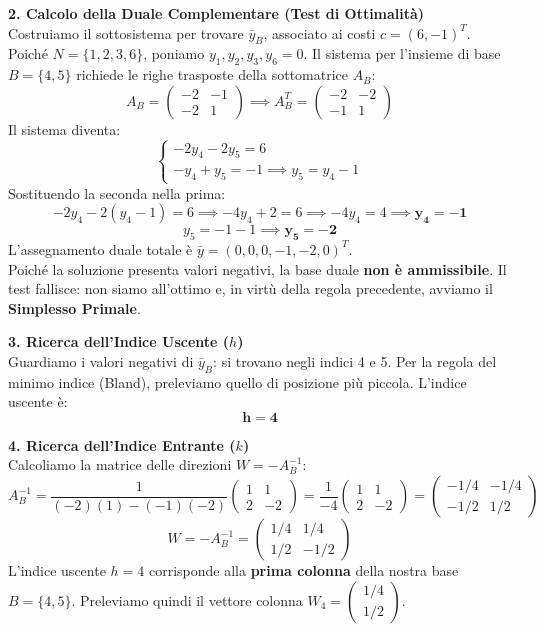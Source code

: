 \documentclass[12pt, a4paper]{article}
\begin{document}
	\vspace{0.4cm}
	\textbf{2. Calcolo della Duale Complementare (Test di Ottimalità)}\\
	Costruiamo il sottosistema per trovare $\bar{y}_B$, associato ai costi $c = (6, -1)^T$. Poiché $N = \{1, 2, 3, 6\}$, poniamo $y_1, y_2, y_3, y_6 = 0$. Il sistema per l'insieme di base $B=\{4,5\}$ richiede le righe trasposte della sottomatrice $A_B$:
	\[
	A_B = \begin{pmatrix} -2 & -1 \\ -2 & 1 \end{pmatrix} \implies A_B^T = \begin{pmatrix} -2 & -2 \\ -1 & 1 \end{pmatrix}
	\]
	Il sistema diventa:
	\[
	\begin{cases}
		-2y_4 - 2y_5 = 6 \\
		-y_4 + y_5 = -1 \implies y_5 = y_4 - 1
	\end{cases}
	\]
	Sostituendo la seconda nella prima:
	\[
	-2y_4 - 2(y_4 - 1) = 6 \implies -4y_4 + 2 = 6 \implies -4y_4 = 4 \implies \mathbf{y_4 = -1}
	\]
	\[
	y_5 = -1 - 1 \implies \mathbf{y_5 = -2}
	\]
	L'assegnamento duale totale è $\bar{y} = (0, 0, 0, -1, -2, 0)^T$. \\
	Poiché la soluzione presenta valori negativi, la base duale \textbf{non è ammissibile}. Il test fallisce: non siamo all'ottimo e, in virtù della regola precedente, avviamo il \textbf{Simplesso Primale}.
	
	\vspace{0.4cm}
	\textbf{3. Ricerca dell'Indice Uscente ($h$)}\\
	Guardiamo i valori negativi di $\bar{y}_B$: si trovano negli indici 4 e 5. 
	Per la regola del minimo indice (Bland), preleviamo quello di posizione più piccola. L'indice uscente è:
	\[
	\mathbf{h = 4}
	\]
	
	\vspace{0.4cm}
	\textbf{4. Ricerca dell'Indice Entrante ($k$)}\\
	Calcoliamo la matrice delle direzioni $W = -A_B^{-1}$:
	\[
	A_B^{-1} = \frac{1}{(-2)(1) - (-1)(-2)} \begin{pmatrix} 1 & 1 \\ 2 & -2 \end{pmatrix} = \frac{1}{-4} \begin{pmatrix} 1 & 1 \\ 2 & -2 \end{pmatrix} = \begin{pmatrix} -1/4 & -1/4 \\ -1/2 & 1/2 \end{pmatrix}
	\]
	\[
	W = -A_B^{-1} = \begin{pmatrix} 1/4 & 1/4 \\ 1/2 & -1/2 \end{pmatrix}
	\]
	L'indice uscente $h=4$ corrisponde alla \textbf{prima colonna} della nostra base $B=\{4,5\}$. Preleviamo quindi il vettore colonna $W_4 = \begin{pmatrix} 1/4 \\ 1/2 \end{pmatrix}$.
	
\end{document}
